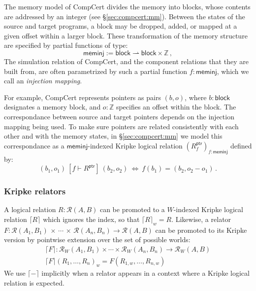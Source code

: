 \documentclass[acmsmall,timestamp,review]{acmart}
\newcommand{\kw}[1]{\ensuremath{ \mathsf{#1} }}
\newcommand{\ifr}[1]{\ [{#1}]\ }
\begin{document}
\begin{example} \label{ex:meminj} %
The memory model of CompCert divides the memory into blocks,
whose contents are addressed by an integer
(see \S\ref{sec:compcert:mm}).
Between the states of the source and target programs,
a block may be dropped, added, or
mapped at a given offset within a larger block.
These transformation of the memory structure
are specified by partial functions of type:
\[
  \kw{meminj} := \kw{block} \rightharpoonup \kw{block} \times \mathbb{Z} \,,
\]
The simulation relation of CompCert,
and the component relations that they are built from,
are often parametrized by such a partial function $f : \kw{meminj}$,
which we call an \emph{injection mapping}.

For example,
CompCert represents pointers as pairs $(b, o)$, where
$b : \kw{block}$ designates a memory block, and
$o : \mathbb{Z}$ specifies an offset within the block.
The correspondance between source and target pointers
depends on the injection mapping being used.
To make sure pointers are related consistently
with each other and with the memory states,
in \S\ref{sec:compcert:mm}
we model this correspondance as a $\kw{meminj}$-indexed
Kripke logical relation $(R^\kw{ptr}_f)_{f : \kw{meminj}}$
defined by:
\[
    (b_1, o_1) \ifr{f \vdash R^\kw{ptr}} (b_2, o_2) \:\Leftrightarrow\:
    f(b_1) = (b_2, o_2 - o_1) \,.
\]
\end{example}

\subsubsection{Kripke relators}

A logical relation $R : \mathcal{R}(A, B)$
can be promoted to a $W$-indexed Kripke logical relation $\lceil R \rceil$
which ignores the index, so that $\lceil R \rceil_w = R$.
Likewise,
a relator
  $F : \mathcal{R}(A_1, B_1) \,\times\,\cdots\,\times\,\mathcal{R}(A_n, B_n) \rightarrow \mathcal{R}(A, B)$
can be promoted to its Kripke version
by pointwise extension over the set of possible worlds:
\begin{gather*}
  \lceil F \rceil : \mathcal{R}_W(A_1, B_1) \times \cdots \times \mathcal{R}_W(A_n, B_n) \rightarrow \mathcal{R}_W(A, B) \\
  \lceil F \rceil (R_1, \ldots, R_n)_w = F(R_{1,w}, \ldots, R_{n,w})
\end{gather*}
We use $\lceil - \rceil$ implicitly
when a relator appears in a context where
a Kripke logical relation is expected.
\end{document}
